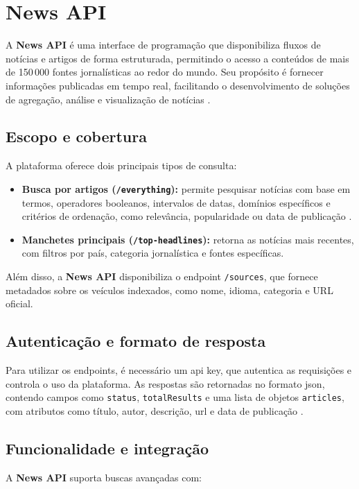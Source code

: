 \section{News API}
\label{sec:news-api}

A \textbf{News API} é uma interface de programação que disponibiliza fluxos de notícias e artigos de forma estruturada, permitindo o acesso a conteúdos de mais de 150\,000 fontes jornalísticas ao redor do mundo. Seu propósito é fornecer informações publicadas em tempo real, facilitando o desenvolvimento de soluções de agregação, análise e visualização de notícias \cite{newsapi_docs}.

\subsection{Escopo e cobertura}
A plataforma oferece dois principais tipos de consulta: 

\begin{itemize}
    \item \textbf{Busca por artigos (\texttt{/everything}):} permite pesquisar notícias com base em termos, operadores booleanos, intervalos de datas, domínios específicos e critérios de ordenação, como relevância, popularidade ou data de publicação \cite{newsapi_docs}.
    \item \textbf{Manchetes principais (\texttt{/top-headlines}):} retorna as notícias mais recentes, com filtros por país, categoria jornalística e fontes específicas.
\end{itemize}

Além disso, a \textbf{News API} disponibiliza o endpoint \texttt{/sources}, que fornece metadados sobre os veículos indexados, como nome, idioma, categoria e URL oficial.

\subsection{Autenticação e formato de resposta}
Para utilizar os endpoints, é necessário um \acrshort{api} key, que autentica as requisições e controla o uso da plataforma. As respostas são retornadas no formato \acrshort{json}, contendo campos como \texttt{status}, \texttt{totalResults} e uma lista de objetos \texttt{articles}, com atributos como título, autor, descrição, \acrshort{url} e data de publicação \cite{newsapi_docs}.

\subsection{Funcionalidade e integração}
A \textbf{News API} suporta buscas avançadas com:

